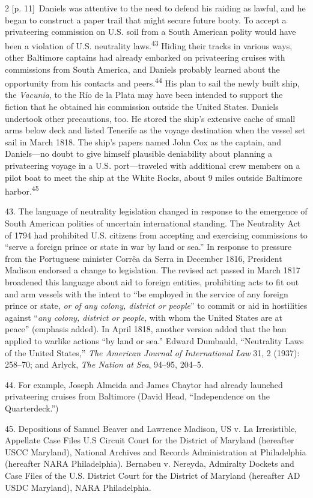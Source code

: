 \documentclass[10pt,a4paper]{article}
\begin{document}
\begin{paracol}{2}
{\scriptsize\color{gray} [p. 11]}\ Daniels was attentive to the need to defend his raiding as lawful, and he began to construct a paper trail that might secure future booty. To accept a privateering commission on U.S. soil from a South American polity would have been a violation of U.S. neutrality laws.\nobreak\textsuperscript{43} Hiding their tracks in various ways, other Baltimore captains had already embarked on privateering cruises with commissions from South America, and Daniels probably learned about the opportunity from his contacts and peers.\nobreak\textsuperscript{44} His plan to sail the newly built ship, the \textit{Vacunia}, to the Río de la Plata may have been intended to support the fiction that he obtained his commission outside the United States. Daniels undertook other precautions, too. He stored the ship’s extensive cache of small arms below deck and listed Tenerife as the voyage destination when the vessel set sail in March 1818. The ship’s papers named John Cox as the captain, and Daniels—no doubt to give himself plausible deniability about planning a privateering voyage in a U.S. port—traveled with additional crew members on a pilot boat to meet the ship at the White Rocks, about 9 miles outside Baltimore harbor.\nobreak\textsuperscript{45}\par{\small 43. The language of neutrality legislation changed in response to the emergence of South American polities of uncertain international standing. The Neutrality Act of 1794 had prohibited U.S. citizens from accepting and exercising commissions to “serve a foreign prince or state in war by land or sea.” In response to pressure from the Portuguese minister Corrêa da Serra in December 1816, President Madison endorsed a change to legislation. The revised act passed in March 1817 broadened this language about aid to foreign entities, prohibiting acts to fit out and arm vessels with the intent to “be employed in the service of any foreign prince or state, \textit{or of any colony, district or people}” to commit or aid in hostilities against “\textit{any colony, district or people}, with whom the United States are at peace” (emphasis added). In April 1818, another version added that the ban applied to warlike actions “by land or sea.” Edward Dumbauld, “Neutrality Laws of the United States,” \textit{The American Journal of International Law} 31, 2 (1937): 258–70; and Arlyck, \textit{The Nation at Sea}, 94–95, 204–5.\par}{\small 44. For example, Joseph Almeida and James Chaytor had already launched privateering cruises from Baltimore (David Head, “Independence on the Quarterdeck.”)\par}{\small 45. Depositions of Samuel Beaver and Lawrence Madison, US v. La Irresistible, Appellate Case Files U.S Circuit Court for the District of Maryland (hereafter USCC Maryland), National Archives and Records Administration at Philadelphia (hereafter NARA Philadelphia). Bernabeu v. Nereyda, Admiralty Dockets and Case Files of the U.S. District Court for the District of Maryland (hereafter AD USDC Maryland), NARA Philadelphia.\par}

\end{paracol}
\end{document}
